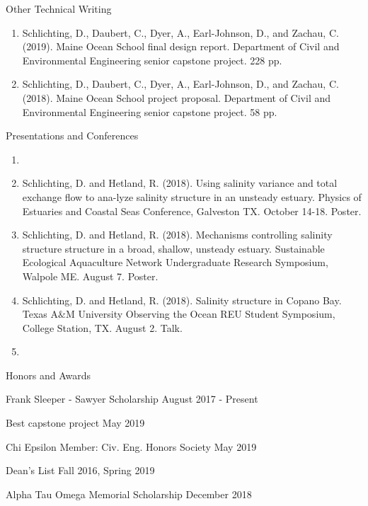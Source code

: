\documentclass{resume} %
\begin{document}
\begin{rSection}{Other Technical Writing} \itemsep -3pt 
\begin{enumerate}
    \item  Schlichting, D., Daubert, C., Dyer, A., Earl-Johnson, D., and Zachau, C. (2019). Maine Ocean School final design report. Department of Civil and Environmental Engineering senior capstone project. 228 pp.
    \item  Schlichting, D., Daubert, C., Dyer, A., Earl-Johnson, D., and Zachau, C. (2018). Maine Ocean School project proposal. Department of Civil and Environmental Engineering senior capstone project. 58 pp.
\end{enumerate}
\end{rSection}

\begin{rSection}{Presentations and Conferences} \itemsep -3pt  
\begin{enumerate}
    \item {}
    \item Schlichting, D. and Hetland, R. (2018). Using salinity variance and total exchange flow to ana-lyze salinity structure in an unsteady estuary. Physics of Estuaries and Coastal Seas Conference, Galveston TX. October 14-18. Poster.
    \item Schlichting, D. and Hetland, R. (2018). Mechanisms controlling salinity structure structure in a broad, shallow, unsteady estuary. Sustainable Ecological Aquaculture Network Undergraduate Research Symposium, Walpole ME. August 7. Poster.
    \item Schlichting, D. and Hetland, R. (2018). Salinity structure in Copano Bay. Texas A$\&$M University Observing the Ocean REU Student Symposium, College Station, TX. August 2. Talk.
    \item {}
\end{enumerate}
\end{rSection}
\begin{rSection}{Honors and Awards} \itemsep -3pt {}
\vspace{-7pt}
\item Frank Sleeper - Sawyer Scholarship \hfill August 2017 - Present
\item Best capstone project \hfill May 2019
\item Chi Epsilon Member: Civ. Eng. Honors Society \hfill May 2019 
\item Dean's List \hfill Fall 2016, Spring 2019
\item Alpha Tau Omega Memorial Scholarship \hfill December 2018
\end{rSection}
\end{document}
